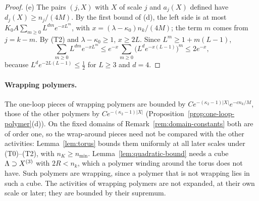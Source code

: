 \begin{proof}
(e) The pairs $(j,X)$ with $X$ of scale $j$ and $a_j(X)$ defined have $d_j(X)\ge n_j/(4M)$. By the first bound of (d), the left side is at most $K_0A\sum_{m\ge0}L^{dm}e^{-xL^m}$, with $x=(\lambda-\kappa_0)n_k/(4M)$; the term $m$ comes from $j=k-m$. By (T2) and $\lambda-\kappa_0\ge1$, $x\ge2L$. Since $L^m\ge1+m(L-1)$,
\[
\sum_{m\ge0}L^{dm}e^{-xL^m}\le e^{-x}\sum_{m\ge0}\big(L^de^{-x(L-1)}\big)^m\le2e^{-x},
\]
because $L^de^{-2L(L-1)}\le\frac12$ for $L\ge3$ and $d=4$.
\end{proof}

\paragraph{Wrapping polymers.} The one-loop pieces of wrapping polymers are bounded by $Ce^{-(\kappa_2-1)|X|}e^{-cn_k/M}$, those of the other polymers by $Ce^{-(\kappa_2-1)|X|}$ (Proposition~\ref{prop:one-loop-polymer}(d)). On the fixed domains of Remark~\ref{rem:domain-constants} both are of order one, so the wrap-around pieces need not be compared with the other activities: Lemma~\ref{lem:torus} bounds them uniformly at all later scales under (T0)--(T2), with $n_K\ge n_{\min}$. Lemma~\ref{lem:quadratic-bound} needs a cube $\Lambda\supset X^{(3)}$ with $2R<n_k$, which a polymer winding around the torus does not have. Such polymers are wrapping, since a polymer that is not wrapping lies in such a cube. The activities of wrapping polymers are not expanded, at their own scale or later; they are bounded by their supremum.

